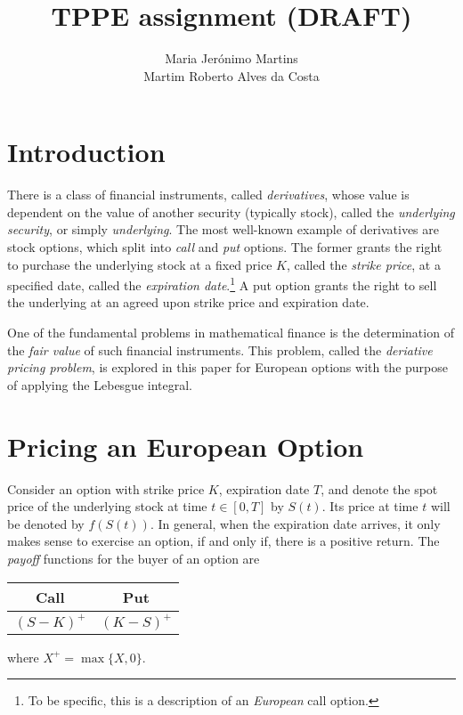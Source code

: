 \documentclass[]{article}
\title{TPPE assignment (DRAFT)}
\author{Maria Jerónimo Martins \\ Martim Roberto Alves da Costa}
\theoremstyle{definition}
\theoremstyle{remark}
\begin{document}
\maketitle

\section{Introduction}
There is a class of financial instruments, called \textit{derivatives}, whose value is dependent on the value of another security (typically stock), called the \textit{underlying security}, or simply \textit{underlying}. The most well-known example of derivatives are stock options, which split into \textit{call} and \textit{put} options. The former grants the right to purchase the underlying stock at a fixed price $K$, called the \textit{strike price}, at a specified date, called the \textit{expiration date}.\footnote{To be specific, this is a description of an \textit{European} call option.}
	A put option grants the right to sell the underlying at an agreed upon strike price and expiration date. 
	\par One of the fundamental problems in mathematical finance is the determination of the \textit{fair value} of such financial instruments. This problem, called the \textit{deriative pricing problem}, is explored in this paper for European options with the purpose of applying the Lebesgue integral.

\section{Pricing an European Option}
Consider an option with strike price $K$, expiration date $T$, and denote the spot price of the underlying stock at time $t \in [0, T]$ by $S(t)$. Its price at time $t$ will be denoted by $f(S(t))$. In general, when the expiration date arrives, it only makes sense to exercise an option, if and only if, there is a positive return. The \textit{payoff} functions for the buyer of an option are
\begin{center}
	\begin{tabular}{|c|c|}
		\hline
		Call      & Put       \\ \hline
		$(S-K)^+$ & $(K-S)^+$ \\ \hline
	\end{tabular}
\end{center}

where $X^+ = \max \{X,0\}$.
\end{document}
